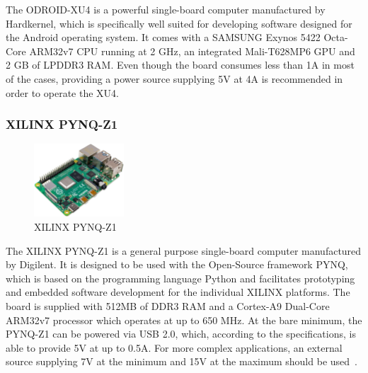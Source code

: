 The ODROID-XU4 is a powerful single-board computer manufactured by Hardkernel, which is specifically well suited for developing software designed for the Android operating system. It comes with a SAMSUNG Exynos 5422 Octa-Core ARM32v7 CPU running at 2 GHz, an integrated Mali-T628MP6 GPU and 2 GB of LPDDR3 RAM. Even though the board consumes less than 1A in most of the cases, providing a power source supplying 5V at 4A is recommended in order to operate the XU4.~\parencite{odroid-xu4-manual}

\subsubsection{XILINX PYNQ-Z1}

\begin{figure}[h]
    \centering
    \includegraphics[width=0.30\textwidth]{./figures/mesh}
    \caption{XILINX PYNQ-Z1}
    \label{fig:xilinx-pynq-z1}
\end{figure}

The XILINX PYNQ-Z1 is a general purpose single-board computer manufactured by Digilent. It is designed to be used with the Open-Source framework PYNQ, which is based on the programming language Python and facilitates prototyping and embedded software development for the individual XILINX platforms. The board is supplied with 512MB of DDR3 RAM and a Cortex-A9 Dual-Core ARM32v7 processor which operates at up to 650 MHz. At the bare minimum, the PYNQ-Z1 can be powered via USB 2.0, which, according to the specifications, is able to provide 5V at up to 0.5A. For more complex applications, an external source supplying 7V at the minimum and 15V at the maximum should be used~\parencite{pynq-z1-manual}.

